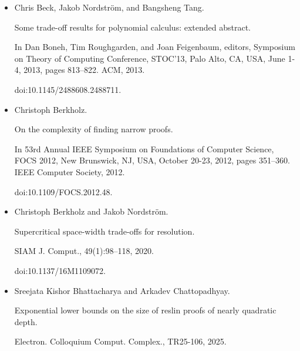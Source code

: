 \documentclass[10pt,a4paper]{article}
\begin{document}
\begin{itemize}
In Yael Tauman Kalai, editor, 14th Innovations in Theoretical
Computer Science Conference (ITCS 2023), volume 251 of Leibniz
International Proceedings in Informatics (LIPIcs), pages 14:1–14:17,
Dagstuhl, Germany, 2023. Schloss Dagstuhl – Leibniz-Zentrum für
Informatik.


doi:10.4230/LIPIcs.ITCS.2023.14.





\item 
[6]

Chris Beck, Jakob Nordström, and Bangsheng Tang.


Some trade-off results for polynomial calculus: extended abstract.


In Dan Boneh, Tim Roughgarden, and Joan Feigenbaum, editors, Symposium on Theory of Computing Conference, STOC’13, Palo Alto, CA, USA,
June 1-4, 2013, pages 813–822. ACM, 2013.


doi:10.1145/2488608.2488711.





\item 
[7]

Christoph Berkholz.


On the complexity of finding narrow proofs.


In 53rd Annual IEEE Symposium on Foundations of Computer
Science, FOCS 2012, New Brunswick, NJ, USA, October 20-23, 2012, pages
351–360. IEEE Computer Society, 2012.


doi:10.1109/FOCS.2012.48.





\item 
[8]

Christoph Berkholz and Jakob Nordström.


Supercritical space-width trade-offs for resolution.


SIAM J. Comput., 49(1):98–118, 2020.


doi:10.1137/16M1109072.





\item 
[9]

Sreejata Kishor Bhattacharya and Arkadev Chattopadhyay.


Exponential lower bounds on the size of reslin proofs of nearly
quadratic depth.


Electron. Colloquium Comput. Complex., TR25-106, 2025.



\end{itemize}
\end{document}
